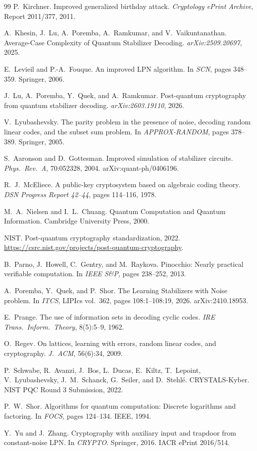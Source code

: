 \documentclass[11pt,a4paper]{article}
\theoremstyle{plain}
\theoremstyle{definition}
\begin{document}
\begin{thebibliography}{99}
P.~Kirchner.
Improved generalized birthday attack.
\emph{Cryptology ePrint Archive}, Report 2011/377, 2011.

A.~Khesin, J.~Lu, A.~Poremba, A.~Ramkumar, and V.~Vaikuntanathan.
Average-Case Complexity of Quantum Stabilizer Decoding.
\emph{arXiv:2509.20697}, 2025.

E.~Levieil and P.-A.~Fouque.
An improved LPN algorithm.
In \emph{SCN}, pages 348--359. Springer, 2006.

J.~Lu, A.~Poremba, Y.~Quek, and A.~Ramkumar.
Post-quantum cryptography from quantum stabilizer decoding.
\emph{arXiv:2603.19110}, 2026.

V.~Lyubashevsky.
The parity problem in the presence of noise, decoding random linear codes, and the subset sum problem.
In \emph{APPROX-RANDOM}, pages 378--389. Springer, 2005.

S.~Aaronson and D.~Gottesman.
Improved simulation of stabilizer circuits.
\emph{Phys.\ Rev.\ A}, 70:052328, 2004. arXiv:quant-ph/0406196.

R.~J.~McEliece.
A public-key cryptosystem based on algebraic coding theory.
\emph{DSN Progress Report 42--44}, pages 114--116, 1978.

M.~A.~Nielsen and I.~L.~Chuang.
Quantum Computation and Quantum Information.
Cambridge University Press, 2000.

NIST.
Post-quantum cryptography standardization, 2022.
\url{https://csrc.nist.gov/projects/post-quantum-cryptography}.

B.~Parno, J.~Howell, C.~Gentry, and M.~Raykova.
Pinocchio: Nearly practical verifiable computation.
In \emph{IEEE S\&P}, pages 238--252, 2013.

A.~Poremba, Y.~Quek, and P.~Shor.
The Learning Stabilizers with Noise problem.
In \emph{ITCS}, LIPIcs vol.~362, pages 108:1--108:19, 2026. arXiv:2410.18953.

E.~Prange.
The use of information sets in decoding cyclic codes.
\emph{IRE Trans.\ Inform.\ Theory}, 8(5):5--9, 1962.

O.~Regev.
On lattices, learning with errors, random linear codes, and cryptography.
\emph{J.\ ACM}, 56(6):34, 2009.

P.~Schwabe, R.~Avanzi, J.~Bos, L.~Ducas, E.~Kiltz, T.~Lepoint, V.~Lyubashevsky, J.~M.~Schanck, G.~Seiler, and D.~Stehl\'e.
CRYSTALS-Kyber.
NIST PQC Round 3 Submission, 2022.

P.~W.~Shor.
Algorithms for quantum computation: Discrete logarithms and factoring.
In \emph{FOCS}, pages 124--134. IEEE, 1994.

Y.~Yu and J.~Zhang.
Cryptography with auxiliary input and trapdoor from constant-noise LPN.
In \emph{CRYPTO}. Springer, 2016. IACR ePrint 2016/514.

\end{thebibliography}
\end{document}
